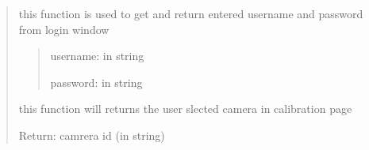 \documentclass[letterpaper,10pt,english]{sphinxmanual}
\begin{document}
\begin{quote}
\begin{savenotes}
\begin{fulllineitems}
\begin{savenotes}
\begin{fulllineitems}
\begin{quote}
\begin{description}
\end{description}\end{quote}

\end{fulllineitems}\end{savenotes}


\begin{savenotes}\begin{fulllineitems}
\label{\detokenize{setting/setting_UI:oxin.setting_UI.UI_main_window.get_user_pass}}
\pysigstartsignatures
{}
\pysigstopsignatures
\sphinxAtStartPar
this function is used to get and return entered username and password from login window
\begin{quote}\begin{description}
\sphinxAtStartPar
username: in string

\sphinxAtStartPar
password: in string

\end{description}\end{quote}

\end{fulllineitems}\end{savenotes}


\begin{savenotes}\begin{fulllineitems}
\label{\detokenize{setting/setting_UI:oxin.setting_UI.UI_main_window.get_width_guage_parms}}
\pysigstartsignatures
{}
\pysigstopsignatures
\sphinxAtStartPar
this function will returns the user slected camera in calibration page

\sphinxAtStartPar
Return: camrera id (in string)

\end{fulllineitems}\end{savenotes}



\end{fulllineitems}
\end{savenotes}
\end{quote}
\end{document}
